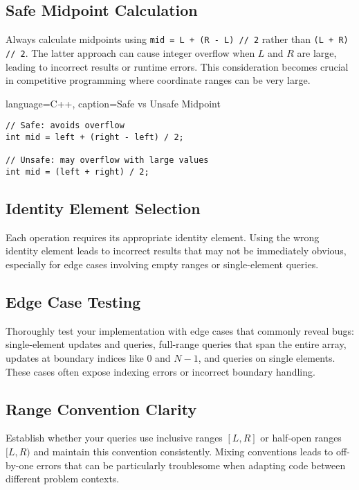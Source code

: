 \subsection{Safe Midpoint Calculation}

Always calculate midpoints using \texttt{mid = L + (R - L) // 2} rather than \texttt{(L + R) // 2}. The latter approach can cause integer overflow when $L$ and $R$ are large, leading to incorrect results or runtime errors. This consideration becomes crucial in competitive programming where coordinate ranges can be very large.

\begin{marginlisting}[0pt]{language=C++, caption=Safe vs Unsafe Midpoint}
\begin{lstlisting}
// Safe: avoids overflow
int mid = left + (right - left) / 2;

// Unsafe: may overflow with large values
int mid = (left + right) / 2;
\end{lstlisting}
\end{marginlisting}

\subsection{Identity Element Selection}

Each operation requires its appropriate identity element. Using the wrong identity element leads to incorrect results that may not be immediately obvious, especially for edge cases involving empty ranges or single-element queries.

\subsection{Edge Case Testing}

Thoroughly test your implementation with edge cases that commonly reveal bugs: single-element updates and queries, full-range queries that span the entire array, updates at boundary indices like $0$ and $N-1$, and queries on single elements. These cases often expose indexing errors or incorrect boundary handling.

\subsection{Range Convention Clarity}

Establish whether your queries use inclusive ranges $[L,R]$ or half-open ranges $[L,R)$ and maintain this convention consistently. Mixing conventions leads to off-by-one errors that can be particularly troublesome when adapting code between different problem contexts.

